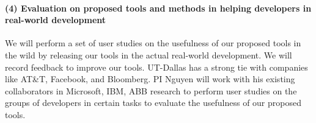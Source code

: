 \paragraph{\bf (4) Evaluation on proposed tools and methods in helping developers in real-world development}

We will perform a set of user studies on the usefulness of our
proposed tools in the wild by releasing our
tools in the actual real-world development. 
We will record feedback to improve our tools.
UT-Dallas has a strong tie with companies like AT\&T, Facebook, and
Bloomberg. PI Nguyen will work with his existing collaborators in
Microsoft, IBM, ABB research to perform user studies on the groups of
developers in certain tasks to evaluate the usefulness of our proposed
tools.
